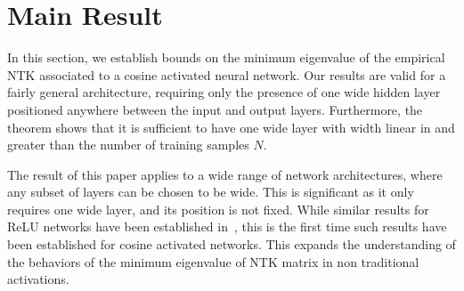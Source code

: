 \documentclass{article}
\theoremstyle{plain}
\theoremstyle{definition}
\theoremstyle{remark}
\begin{document}
\section{Main Result}\label{sec_main_result}




In this section, we establish bounds on the minimum eigenvalue of the empirical NTK associated to a cosine activated neural network. Our results are valid for a fairly general architecture, requiring only the presence of one wide hidden layer positioned anywhere between the input and output layers. Furthermore, the theorem shows that it is sufficient to have one wide layer with width linear in and greater than the number of training samples $N$.

The result of this paper applies to a wide range of network architectures, where any subset of layers can be chosen to be wide. This is significant as it only requires one wide layer, and its position is not fixed. While similar results for ReLU networks have been established in~\cite{nguyen2020global, nguyen2021tight}, this is the first time such results have been established for cosine activated networks. This expands the understanding of the behaviors of the minimum eigenvalue of NTK matrix in non traditional activations.
\end{document}
